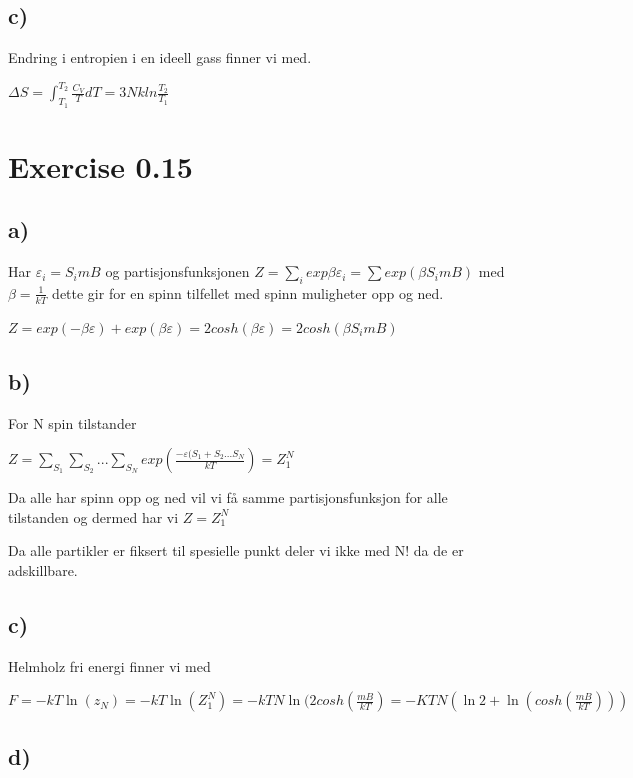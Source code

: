 \documentclass[14pt]{article}
\begin{document}
\subsection*{c)}

Endring i entropien i en ideell gass finner vi med. 

$\Delta S = \int_{T_1}^{T_2} \frac{C_V}{T} dT = 3Nk ln \frac{T_2}{T_1} $


\section*{Exercise 0.15}

\subsection*{a)}
Har $\varepsilon_i = S_i mB$ og partisjonsfunksjonen $Z = \sum_i exp{\beta \varepsilon_i } = \sum exp(\beta S_imB)$  med $\beta = \frac{1}{kT}$ dette gir for en spinn tilfellet med spinn muligheter opp og ned.

$Z = exp(-\beta \varepsilon ) + exp(\beta \varepsilon ) = 2cosh(\beta \varepsilon ) = 2cosh(\beta S_imB)$

\subsection*{b)}

For N spin tilstander 

$Z = \sum_{S_1} \sum_{S_2}...\sum_{S_N} exp(\frac{-\varepsilon (S_1 +S_2 ...S_N}{kT}) = Z_1^N$ 

Da alle har spinn opp og ned vil vi få samme partisjonsfunksjon for alle tilstanden og dermed har vi $Z = Z_1^N$ 

Da alle partikler er fiksert til spesielle punkt deler vi ikke med N! da de er adskillbare.

\subsection*{c)}

Helmholz fri energi finner vi med 

$F = -kT \ln (z_N) = -kT \ln (Z_1^N) = -kTN \ln (2 cosh(\frac{mB}{kT}) = -KTN ( \ln 2 + \ln (cosh(\frac{mB}{kT}))) $ 


\subsection*{d)}
\end{document}
